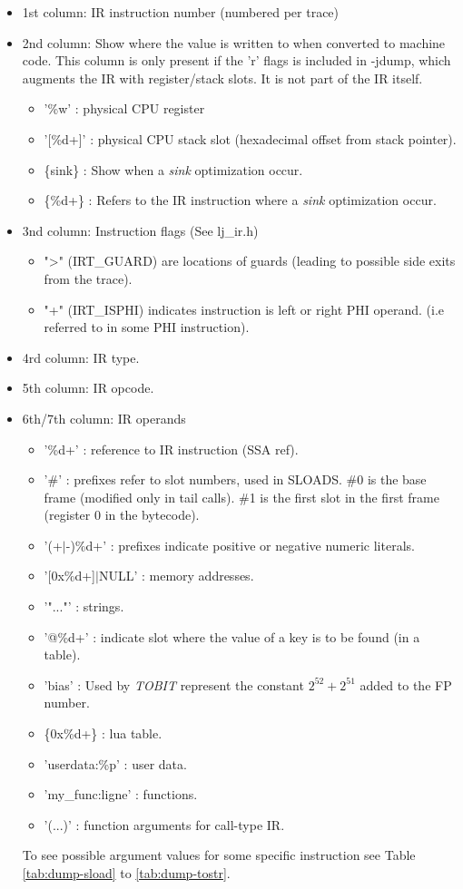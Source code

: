 \begin{itemize}
  \item 1st column: IR instruction number (numbered per trace)
  \item 2nd column: Show where the value is written to when converted to machine
    code. This column is only present if the 'r' flags is included in -jdump,
    which augments the IR with register/stack slots. It is not part of the IR
    itself.
    \begin{itemize}
      \item '\%w' : physical CPU register
      \item '[\%d+]' : physical CPU stack slot (hexadecimal offset from stack pointer).
      \item \{sink\} : Show when a \emph{sink} optimization occur.
      \item \{\%d+\} : Refers to the IR instruction where a \emph{sink}
        optimization occur.
    \end{itemize}
  \item 3nd column: Instruction flags (See lj\_ir.h)
  \begin{itemize}
    \item "\textgreater" (IRT\_GUARD) are locations of
        guards (leading to possible side exits from the trace).
    \item "+" (IRT\_ISPHI) indicates
        instruction is left or right PHI operand. (i.e referred
        to in some PHI instruction).
  \end{itemize}
  \item 4rd column: IR type.
  \item 5th column: IR opcode.
  \item 6th/7th column: IR operands
    \begin{itemize}
      \item '\%d+' : reference to IR instruction (SSA ref).
      \item '\#' : prefixes refer to slot numbers, used in SLOADS.
        \#0 is the base frame (modified only in tail calls).
        \#1 is the first slot in the first frame (register 0 in
        the bytecode).
      \item '(+$\vert$-)\%d+' : prefixes indicate positive or negative numeric literals.
      \item '[0x\%d+]$\vert$NULL' : memory addresses.
      \item '"..."' : strings.
      \item '@\%d+' : indicate slot where the value of a key is to be found (in a table).
      \item 'bias' : Used by \emph{TOBIT} represent the constant
        $2^{52}+2^{51}$ added to the FP number.
      \item \{0x\%d+\} : lua table.
      \item 'userdata:\%p' : user data.
      \item 'my\_func:ligne' : functions.
      \item '(...)' : function arguments for call-type IR.
    \end{itemize}
    To see possible argument values for some specific instruction see Table
    \ref{tab:dump-sload} to \ref{tab:dump-tostr}.
\end{itemize}


